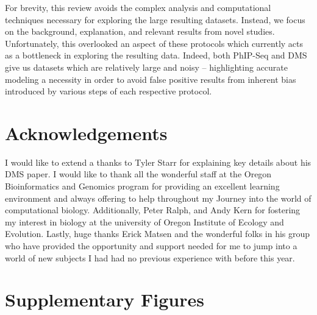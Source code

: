 \documentclass{article}
\begin{document}
For brevity, this review avoids the complex analysis and computational techniques necessary for exploring the large resulting datasets.
Instead, we focus on the background, explanation, and relevant results from novel studies.
Unfortunately, this overlooked an aspect of these protocols which currently acts as a bottleneck in exploring the resulting data.
Indeed, both PhIP-Seq and DMS give us datasets which are relatively large and noisy -- highlighting accurate modeling a necessity in order to avoid false positive results from inherent bias introduced by various steps of each respective protocol.

\section*{Acknowledgements}
I would like to extend a thanks to Tyler Starr for explaining key details about his DMS paper. I would like to thank all the wonderful staff at the Oregon Bioinformatics and Genomics program for providing an excellent learning environment and always offering to help throughout my Journey into the world of computational biology. 
Additionally, Peter Ralph, and Andy Kern for fostering my interest in biology at the university of Oregon Institute of Ecology and Evolution. Lastly, huge thanks Erick Matsen and the wonderful folks in his group who have provided the opportunity and support needed for me to jump into a world of new subjects I had had no previous experience with before this year.




\section*{Supplementary Figures}
\end{document}
